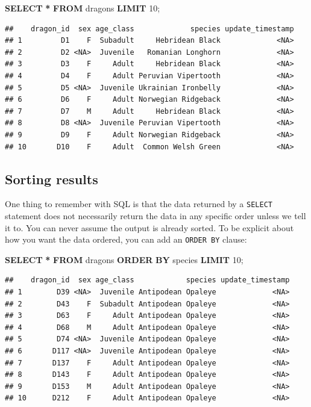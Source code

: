 \documentclass[
]{book}
\newenvironment{Shaded}{\begin{snugshade}}{\end{snugshade}}
\newcommand{\DecValTok}[1]{\textcolor[rgb]{0.00,0.00,0.81}{#1}}
\newcommand{\KeywordTok}[1]{\textcolor[rgb]{0.13,0.29,0.53}{\textbf{#1}}}
\newcommand{\NormalTok}[1]{#1}
\newcommand{\OperatorTok}[1]{\textcolor[rgb]{0.81,0.36,0.00}{\textbf{#1}}}
\begin{document}
\begin{Shaded}
\begin{Highlighting}[]
\KeywordTok{SELECT} \OperatorTok{*} 
\KeywordTok{FROM}\NormalTok{ dragons }
\KeywordTok{LIMIT} \DecValTok{10}\NormalTok{;}
\end{Highlighting}
\end{Shaded}

\begin{verbatim}
##    dragon_id  sex age_class             species update_timestamp
## 1         D1    F  Subadult     Hebridean Black             <NA>
## 2         D2 <NA>  Juvenile   Romanian Longhorn             <NA>
## 3         D3    F     Adult     Hebridean Black             <NA>
## 4         D4    F     Adult Peruvian Vipertooth             <NA>
## 5         D5 <NA>  Juvenile Ukrainian Ironbelly             <NA>
## 6         D6    F     Adult Norwegian Ridgeback             <NA>
## 7         D7    M     Adult     Hebridean Black             <NA>
## 8         D8 <NA>  Juvenile Peruvian Vipertooth             <NA>
## 9         D9    F     Adult Norwegian Ridgeback             <NA>
## 10       D10    F     Adult  Common Welsh Green             <NA>
\end{verbatim}

\hypertarget{sorting-results}{%
\subsection{Sorting results}\label{sorting-results}}

One thing to remember with SQL is that the data returned by a \texttt{SELECT} statement
does not necessarily return the data in any specific order unless we tell it to.
You can never assume the output is already sorted. To be explicit about how you
want the data ordered, you can add an \texttt{ORDER\ BY} clause:

\begin{Shaded}
\begin{Highlighting}[]
\KeywordTok{SELECT} \OperatorTok{*} 
\KeywordTok{FROM}\NormalTok{ dragons }
\KeywordTok{ORDER} \KeywordTok{BY}\NormalTok{ species}
\KeywordTok{LIMIT} \DecValTok{10}\NormalTok{;}
\end{Highlighting}
\end{Shaded}

\begin{verbatim}
##    dragon_id  sex age_class            species update_timestamp
## 1        D39 <NA>  Juvenile Antipodean Opaleye             <NA>
## 2        D43    F  Subadult Antipodean Opaleye             <NA>
## 3        D63    F     Adult Antipodean Opaleye             <NA>
## 4        D68    M     Adult Antipodean Opaleye             <NA>
## 5        D74 <NA>  Juvenile Antipodean Opaleye             <NA>
## 6       D117 <NA>  Juvenile Antipodean Opaleye             <NA>
## 7       D137    F     Adult Antipodean Opaleye             <NA>
## 8       D143    F     Adult Antipodean Opaleye             <NA>
## 9       D153    M     Adult Antipodean Opaleye             <NA>
## 10      D212    F     Adult Antipodean Opaleye             <NA>
\end{verbatim}
\end{document}
